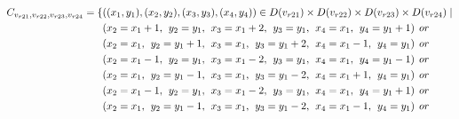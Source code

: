 \begin{align*}
\Const{r21}{r22}{r23}{r24}=\{&((x_{1},y_{1}),(x_{2},y_{2}),(x_{3},y_{3}),(x_{4},y_{4}))\in \Domain{r21}\times \Domain{r22}\times\Domain{r23}\times\Domain{r24}\mid\\
&(x_{2} = x_{1} + 1,\hspace{1ex}y_{2} = y_{1},\hspace{1ex}x_{3} = x_{1} + 2, \hspace{1ex}y_{3} = y_{1},\hspace{1ex}x_{4} = x_{1},\hspace{1ex}y_{4} = y_{1}+1)\hspace{1ex} or\\
&(x_{2} = x_{1},\hspace{1ex}y_{2} = y_{1}+1,\hspace{1ex}x_{3} = x_{1}, \hspace{1ex}y_{3} = y_{1}+2,\hspace{1ex}x_{4} = x_{1}-1,\hspace{1ex}y_{4} = y_{1})\hspace{1ex} or\\
&(x_{2} = x_{1}-1,\hspace{1ex}y_{2} = y_{1},\hspace{1ex}x_{3} = x_{1}-2,\hspace{1ex} y_{3} = y_{1},\hspace{1ex}x_{4} = x_{1},\hspace{1ex}y_{4} = y_{1}-1)\hspace{1ex} or\\
&(x_{2} = x_{1},\hspace{1ex}y_{2} = y_{1}-1,\hspace{1ex}x_{3} = x_{1}, \hspace{1ex}y_{3} = y_{1}-2,\hspace{1ex}x_{4} = x_{1}+1,\hspace{1ex}y_{4} = y_{1})\hspace{1ex} or\\
&(x_{2} = x_{1}-1,\hspace{1ex}y_{2} = y_{1},\hspace{1ex}x_{3} = x_{1}-2, \hspace{1ex}y_{3} = y_{1},\hspace{1ex}x_{4} = x_{1},\hspace{1ex}y_{4} = y_{1}+1)\hspace{1ex} or\\
&(x_{2} = x_{1},\hspace{1ex}y_{2} = y_{1}-1,\hspace{1ex}x_{3} = x_{1}, \hspace{1ex}y_{3} = y_{1}-2,\hspace{1ex}x_{4} = x_{1}-1,\hspace{1ex}y_{4} = y_{1})\hspace{1ex} or\\

\end{align*}
